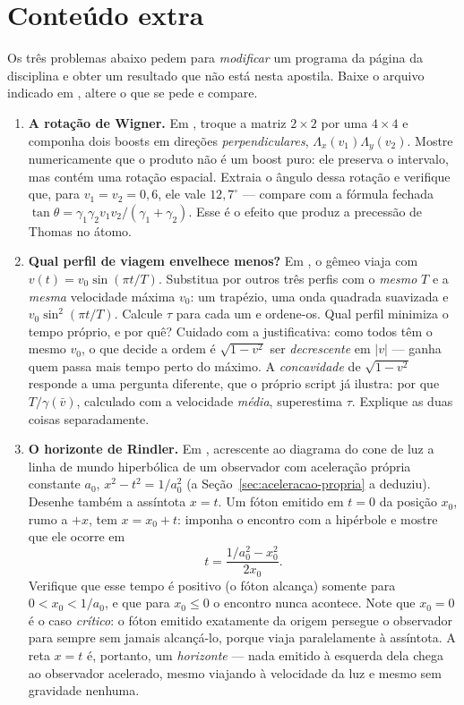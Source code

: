 \documentclass[12pt,a4paper,oneside]{book}
\theoremstyle{rgplain}
\theoremstyle{rgremark}
\begin{document}
\section{Conteúdo extra}

Os três problemas abaixo pedem para \emph{modificar} um programa da página da disciplina e obter um resultado que não está nesta apostila. Baixe o arquivo indicado em \href{\rgsitecodigos}{\texttt{\rgsitecodigos}}, altere o que se pede e compare.

\begin{enumerate}
  \item \textbf{A rotação de Wigner.} Em , troque a matriz
$2\times2$ por uma $4\times4$ e componha dois boosts em direções
\emph{perpendiculares}, $\Lambda_x(v_1)\Lambda_y(v_2)$. Mostre
numericamente que o produto não é um boost puro: ele preserva o intervalo,
mas contém uma rotação espacial. Extraia o ângulo dessa rotação e verifique
que, para $v_1=v_2=0{,}6$, ele vale $12{,}7^\circ$ --- compare com a fórmula
fechada $\tan\theta=\gamma_1\gamma_2v_1v_2/(\gamma_1+\gamma_2)$. Esse é o
efeito que produz a precessão de Thomas no átomo.

  \item \textbf{Qual perfil de viagem envelhece menos?} Em
, o gêmeo viaja com
$v(t)=v_0\sin(\pi t/T)$. Substitua por outros três perfis com o
\emph{mesmo} $T$ e a \emph{mesma} velocidade máxima $v_0$: um trapézio, uma
onda quadrada suavizada e $v_0\sin^2(\pi t/T)$. Calcule $\tau$ para cada um
e ordene-os. Qual perfil minimiza o tempo próprio, e por quê? Cuidado com a
justificativa: como todos têm o mesmo $v_0$, o que decide a ordem é
$\sqrt{1-v^2}$ ser \emph{decrescente} em $|v|$ --- ganha quem passa mais
tempo perto do máximo. A \emph{concavidade} de $\sqrt{1-v^2}$ responde a uma
pergunta diferente, que o próprio script já ilustra: por que
$T/\gamma(\bar v)$, calculado com a velocidade \emph{média}, superestima
$\tau$. Explique as duas coisas separadamente.

  \item \textbf{O horizonte de Rindler.} Em , acrescente
ao diagrama do cone de luz a linha de mundo hiperbólica de um observador com
aceleração própria constante $a_0$, $x^2-t^2=1/a_0^2$ (a
Seção~\ref{sec:aceleracao-propria} a deduziu). Desenhe também a assíntota
$x=t$. Um fóton emitido em $t=0$ da posição $x_0$, rumo a $+x$, tem
$x=x_0+t$: imponha o encontro com a hipérbole e mostre que ele ocorre em
\[
  t=\frac{1/a_0^2-x_0^2}{2x_0} .
\]
Verifique que esse tempo é positivo (o fóton alcança) somente para
$0<x_0<1/a_0$, e que para $x_0\le0$ o encontro nunca acontece. Note que
$x_0=0$ é o caso \emph{crítico}: o fóton emitido exatamente da origem
persegue o observador para sempre sem jamais alcançá-lo, porque viaja
paralelamente à assíntota. A reta $x=t$ é, portanto, um \emph{horizonte} ---
nada emitido à esquerda dela chega ao observador acelerado, mesmo viajando à
velocidade da luz e mesmo sem gravidade nenhuma.
\end{enumerate}
\end{document}
